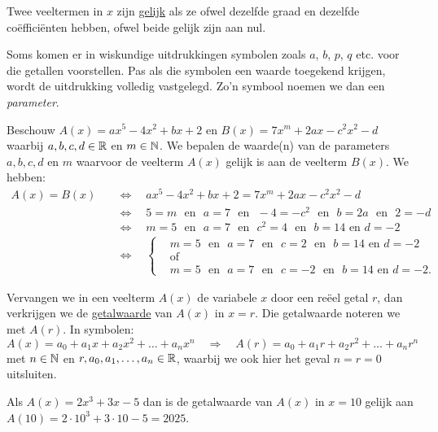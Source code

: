 \documentclass{ximera}
\begin{document}
Twee veeltermen in $x$ zijn \underline{gelijk} als ze ofwel dezelfde graad en dezelfde co\"effici\"enten hebben, ofwel beide gelijk zijn aan nul. 

Soms komen er in wiskundige uitdrukkingen symbolen zoals $a$, $b$, $p$, $q$ etc. voor die getallen voorstellen. Pas als die symbolen een waarde toegekend krijgen, wordt de uitdrukking volledig vastgelegd. Zo'n symbool noemen we dan een {\em parameter}. 

\begin{voorbeeld}
Beschouw $A(x) = ax^5 - 4x^2 + bx + 2$ en $B(x) = 7x^m + 2ax - c^2x^2 - d$ waarbij $a,b,c,d \in \mathbb{R}$ en $m \in \mathbb{N}$. We bepalen de waarde(n) van de parameters $a,b,c,d$ en $m$ waarvoor de veelterm $A(x)$ gelijk is aan de veelterm $B(x)$. We hebben: 
\begin{align*}
A(x) = B(x) \quad 
& \Leftrightarrow \quad ax^5 - 4x^2 + bx + 2 = 7x^m + 2ax - c^2x^2 - d \\
& \Leftrightarrow \quad 5 = m \,\,\text{ en }\,\, a = 7 \,\,\text{ en }\,\, -4 = -c^2 \,\,\text{ en }\,\, b = 2a \,\,\text{ en }\,\, 2 = -d \\
& \Leftrightarrow \quad m=5 \,\,\text{ en }\,\, a = 7 \,\,\text{ en }\,\, c^2 = 4 \,\,\text{ en }\,\, b = 14 \text{ en } d = -2 \\
& \Leftrightarrow \quad 
\left\{
\begin{aligned}
& m=5 \,\,\text{ en }\,\, a = 7 \,\,\text{ en }\,\, c = 2 \,\,\text{ en }\,\, b = 14 \text{ en } d = -2 \\
& \text{of} \\
& m=5 \,\,\text{ en }\,\, a = 7 \,\,\text{ en }\,\, c = -2 \,\,\text{ en }\,\, b = 14 \text{ en } d = -2.
\end{aligned}
\right.
\end{align*}
\end{voorbeeld}

Vervangen we in een veelterm $A(x)$ de variabele $x$ door een re\"eel getal $r$, dan verkrijgen we de \underline{getalwaarde} van $A(x)$ in $x = r$. Die getalwaarde noteren we met $A(r)$. In symbolen:
\[
A(x) = a_0 + a_1x + a_2x^2 + \dots + a_n x^n \quad 
\Rightarrow
\quad A(r) = a_0 + a_1 r + a_2r^2 + \dots + a_n r^n
\]
met $n \in \mathbb{N}$ en $r, a_0, a_1, \ldots, a_n \in \mathbb{R}$, waarbij we ook hier het geval $n = r = 0$ uitsluiten. %

\begin{voorbeeld}
Als $A(x) = 2x^3+3x-5$ dan is de getalwaarde van $A(x)$ in $x = 10$ gelijk aan $A(10) = 2\cdot 10^3 + 3 \cdot 10 - 5 = 2025$.
\end{voorbeeld}
\end{document}

